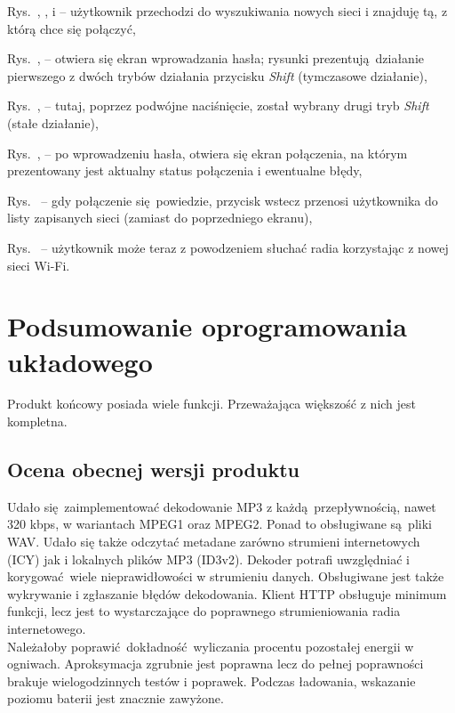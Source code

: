 \documentclass[polish]{aghengthesis}
\let\tempone\itemize
\let\temptwo\enditemize
\renewenvironment{itemize}{\tempone\setlength{\itemsep}{0cm}}{\temptwo}
\begin{document}
			\begin{itemize}
				\item Rys.~, ,  i  -- użytkownik przechodzi do wyszukiwania nowych sieci i znajduję tą, z którą chce się połączyć,
				\item Rys.~,  -- otwiera się ekran wprowadzania hasła; rysunki prezentują działanie pierwszego z dwóch trybów działania przycisku \textit{Shift} (tymczasowe działanie),
				\item Rys.~,  -- tutaj, poprzez podwójne naciśnięcie, został wybrany drugi tryb \textit{Shift} (stałe działanie),
				\item Rys.~,  -- po wprowadzeniu hasła, otwiera się ekran połączenia, na którym prezentowany jest aktualny status połączenia i ewentualne błędy,
				\item Rys.~ -- gdy połączenie się powiedzie, przycisk wstecz przenosi użytkownika do listy zapisanych sieci (zamiast do poprzedniego ekranu),
				\item Rys.~ -- użytkownik może teraz z powodzeniem słuchać radia korzystając z nowej sieci Wi-Fi.
			\end{itemize}
			
	\section{Podsumowanie oprogramowania układowego}
		Produkt końcowy posiada wiele funkcji. Przeważająca większość z nich jest kompletna.
		
		\subsection{Ocena obecnej wersji produktu}
			Udało się zaimplementować dekodowanie MP3 z każdą przepływnością, nawet 320 kbps, w wariantach MPEG1 oraz MPEG2. Ponad to obsługiwane są pliki WAV. Udało się także odczytać metadane zarówno strumieni internetowych (ICY) jak i lokalnych plików MP3 (ID3v2). Dekoder potrafi uwzględniać i korygować wiele nieprawidłowości w strumieniu danych. Obsługiwane jest także wykrywanie i zgłaszanie błędów dekodowania. Klient HTTP obsługuje minimum funkcji, lecz jest to wystarczające do poprawnego strumieniowania radia internetowego.
			$ $\\
			
			Należałoby poprawić dokładność wyliczania procentu pozostałej energii w ogniwach. Aproksymacja zgrubnie jest poprawna lecz do pełnej poprawności brakuje wielogodzinnych testów i poprawek. Podczas ładowania, wskazanie poziomu baterii jest znacznie zawyżone.
			$ $\\
			
\end{document}
